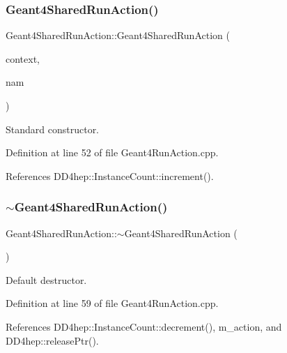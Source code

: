 \subsubsection{\texorpdfstring{Geant4\+Shared\+Run\+Action()}{Geant4SharedRunAction()}}
{\footnotesize\ttfamily Geant4\+Shared\+Run\+Action\+::\+Geant4\+Shared\+Run\+Action (\begin{DoxyParamCaption}\item[{\hyperlink{class_d_d4hep_1_1_simulation_1_1_geant4_context}{Geant4\+Context} $\ast$}]{context,  }\item[{const std\+::string \&}]{nam }\end{DoxyParamCaption})}



Standard constructor. 



Definition at line 52 of file Geant4\+Run\+Action.\+cpp.



References D\+D4hep\+::\+Instance\+Count\+::increment().

\hypertarget{class_d_d4hep_1_1_simulation_1_1_geant4_shared_run_action_a519c22826231728b12792015e2a96837}{}\label{class_d_d4hep_1_1_simulation_1_1_geant4_shared_run_action_a519c22826231728b12792015e2a96837} 
\subsubsection{\texorpdfstring{$\sim$\+Geant4\+Shared\+Run\+Action()}{~Geant4SharedRunAction()}}
{\footnotesize\ttfamily Geant4\+Shared\+Run\+Action\+::$\sim$\+Geant4\+Shared\+Run\+Action (\begin{DoxyParamCaption}{ }\end{DoxyParamCaption})\hspace{0.3cm}{\ttfamily [virtual]}}



Default destructor. 



Definition at line 59 of file Geant4\+Run\+Action.\+cpp.



References D\+D4hep\+::\+Instance\+Count\+::decrement(), m\+\_\+action, and D\+D4hep\+::release\+Ptr().



